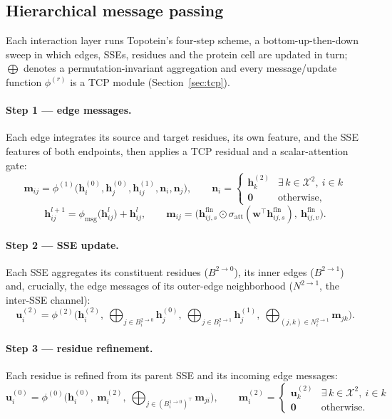 \documentclass[11pt,a4paper]{article}
\theoremstyle{definition}
\begin{document}
\subsection{Hierarchical message passing}
\label{sec:attention}

Each interaction layer runs Topotein's four-step scheme, a bottom-up-then-down
sweep in which edges, SSEs, residues and the protein cell are updated in turn;
$\bigoplus$ denotes a permutation-invariant aggregation and every message/update
function $\phi^{(r)}$ is a TCP module (Section~\ref{sec:tcp}).

\paragraph{Step 1 --- edge messages.} Each edge integrates its source and target
residues, its own feature, and the SSE features of both endpoints, then applies a
TCP residual and a scalar-attention gate:
\[
\mathbf{m}_{ij}=\phi^{(1)}\big(\mathbf{h}^{(0)}_i,\mathbf{h}^{(0)}_j,\mathbf{h}^{(1)}_{ij},\mathbf{n}_i,\mathbf{n}_j\big),\qquad
\mathbf{n}_i=\begin{cases}\mathbf{h}^{(2)}_k & \exists\,k\in\mathcal{X}^{2},\ i\in k\\ \mathbf{0} & \text{otherwise,}\end{cases}
\]
\[
\mathbf{h}^{l+1}_{ij}=\phi_{\mathrm{msg}}\big(\mathbf{h}^{l}_{ij}\big)+\mathbf{h}^{l}_{ij},\qquad
\mathbf{m}_{ij}=\big(\mathbf{h}^{\mathrm{fin}}_{ij,s}\odot\sigma_{\mathrm{att}}(\mathbf{w}^{\top}\mathbf{h}^{\mathrm{fin}}_{ij,s}),\ \mathbf{h}^{\mathrm{fin}}_{ij,v}\big).
\]

\paragraph{Step 2 --- SSE update.} Each SSE aggregates its constituent residues
($B^{2\to0}$), its inner edges ($B^{2\to1}$) and, crucially, the edge messages of
its outer-edge neighborhood ($N^{2\to1}$, the inter-SSE channel):
\[
\mathbf{u}^{(2)}_i=\phi^{(2)}\Big(\mathbf{h}^{(2)}_i,\ \bigoplus_{j\in B^{2\to0}_i}\mathbf{h}^{(0)}_j,\ \bigoplus_{j\in B^{2\to1}_i}\mathbf{h}^{(1)}_j,\ \bigoplus_{(j,k)\in N^{2\to1}_i}\mathbf{m}_{jk}\Big).
\]

\paragraph{Step 3 --- residue refinement.} Each residue is refined from its parent
SSE and its incoming edge messages:
\[
\mathbf{u}^{(0)}_i=\phi^{(0)}\Big(\mathbf{h}^{(0)}_i,\ \mathbf{m}^{(2)}_i,\ \bigoplus_{j\in(B^{1\to0}_i)^{\top}}\mathbf{m}_{ji}\Big),\qquad
\mathbf{m}^{(2)}_i=\begin{cases}\mathbf{u}^{(2)}_k & \exists\,k\in\mathcal{X}^{2},\ i\in k\\ \mathbf{0} & \text{otherwise.}\end{cases}
\]
\end{document}
